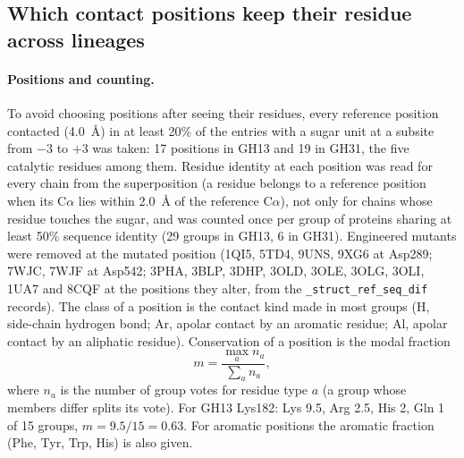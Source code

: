 \subsection{Which contact positions keep their residue across lineages}

\paragraph{Positions and counting.} To avoid choosing positions after seeing their residues,
every reference position contacted (4.0~\AA) in at least 20\% of the entries with a sugar
unit at a subsite from $-3$ to $+3$ was taken: 17 positions in GH13 and 19 in GH31, the five
catalytic residues among them. Residue identity at each position was read for every chain from
the superposition (a residue belongs to a reference position when its C$\alpha$ lies within
2.0~\AA{} of the reference C$\alpha$), not only for chains whose residue touches the sugar, and
was counted once per group of proteins sharing at least 50\% sequence identity (29 groups in
GH13, 6 in GH31). Engineered mutants were removed at the mutated position (1QI5, 5TD4, 9UNS,
9XG6 at Asp289; 7WJC, 7WJF at Asp542; 3PHA, 3BLP, 3DHP, 3OLD, 3OLE, 3OLG, 3OLI, 1UA7 and 8CQF at
the positions they alter, from the \texttt{\_struct\_ref\_seq\_dif} records). The class of a
position is the contact kind made in most groups (H, side-chain hydrogen bond; Ar, apolar
contact by an aromatic residue; Al, apolar contact by an aliphatic residue). Conservation of a
position is the modal fraction
\begin{equation}
m = \frac{\max_a n_a}{\sum_a n_a},
\label{eq:modal}
\end{equation}
where $n_a$ is the number of group votes for residue type $a$ (a group whose members differ
splits its vote). For GH13 Lys182: Lys 9.5, Arg 2.5, His 2, Gln 1 of 15 groups,
$m = 9.5/15 = 0.63$. For aromatic positions the aromatic fraction (Phe, Tyr, Trp, His) is also
given.

